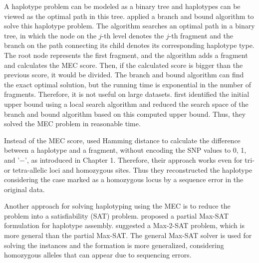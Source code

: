 A haplotype problem can be modeled as a binary tree and haplotypes can be viewed as the optimal path in this tree. 
\cite{wang2005haplotype} applied a branch
and bound algorithm to solve this haplotype problem. 
The algorithm searches an optimal path in a binary tree, in which
the node on the $j$-th level denotes the $j$-th fragment and the
branch on the path connecting its child denotes its
corresponding haplotype type. 
The root node represents the first fragment, and the
algorithm adds a fragment and calculates the MEC score. 
Then, if the calculated score is bigger than the previous score, it would be divided. 
The branch and bound algorithm
can find the exact optimal solution, but the running time is exponential in the number of
fragments. Therefore, it is not useful on large datasets. 
\cite{lim2012individual} first identified the initial upper bound using a local search algorithm and 
reduced the search space of the branch and bound algorithm based on this computed upper bound.
Thus, they solved the MEC problem in reasonable time.

Instead of the MEC score, \cite{wang2012using} used Hamming distance to calculate the difference between a haplotype and a fragment, 
without encoding the SNP values to 0, 1, and '−', as introduced in Chapter 1. 
Therefore, their  approach works even for tri- or tetra-allelic loci and homozygous sites. 
Thus they reconstructed the haplotype considering the case marked as a homozygous locus by a sequence error in the original data. 

Another approach for solving haplotyping using the MEC is to reduce the problem into a satisfiability (SAT) problem. 
\cite{he2010optimal} proposed a partial Max-SAT formulation for haplotype assembly. 
\cite{mousavi2011effective} suggested a Max-2-SAT problem,
which is more general than the partial Max-SAT. The general Max-SAT solver is used for solving the instances and the formation is more generalized, 
considering homozygous alleles that can appear due to sequencing errors.

